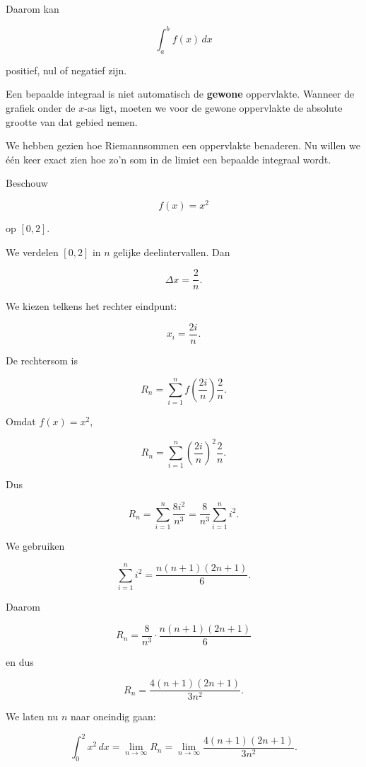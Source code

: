 \documentclass{ximera}
\begin{document}
Daarom kan

\[
\int_a^b f(x)\,dx
\]

positief, nul of negatief zijn.

\begin{opmerking}
Een bepaalde integraal is niet automatisch de \textbf{gewone}
oppervlakte. Wanneer de grafiek onder de \(x\)-as ligt, moeten we voor
de gewone oppervlakte de absolute grootte van dat gebied nemen.
\end{opmerking}




We hebben gezien hoe Riemannsommen een oppervlakte benaderen. Nu willen
we één keer exact zien hoe zo'n som in de limiet een bepaalde integraal
wordt.

Beschouw

\[
f(x)=x^2
\]

op \([0,2]\).

We verdelen \([0,2]\) in \(n\) gelijke deelintervallen. Dan

\[
\Delta x=\frac{2}{n}.
\]

We kiezen telkens het rechter eindpunt:

\[
x_i=\frac{2i}{n}.
\]

De rechtersom is

\[
R_n
=
\sum_{i=1}^{n}
f\left(\frac{2i}{n}\right)\frac{2}{n}.
\]

Omdat \(f(x)=x^2\),

\[
R_n
=
\sum_{i=1}^{n}
\left(\frac{2i}{n}\right)^2\frac{2}{n}.
\]

Dus

\[
R_n
=
\sum_{i=1}^{n}
\frac{8i^2}{n^3}
=
\frac{8}{n^3}
\sum_{i=1}^{n}i^2.
\]

We gebruiken

\[
\sum_{i=1}^{n}i^2
=
\frac{n(n+1)(2n+1)}{6}.
\]

Daarom

\[
R_n
=
\frac{8}{n^3}
\cdot
\frac{n(n+1)(2n+1)}{6}
\]

en dus

\[
R_n
=
\frac{4(n+1)(2n+1)}{3n^2}.
\]

We laten nu \(n\) naar oneindig gaan:

\[
\int_0^2x^2\,dx
=
\lim_{n\to\infty}R_n
=
\lim_{n\to\infty}
\frac{4(n+1)(2n+1)}{3n^2}.
\]
\end{document}
